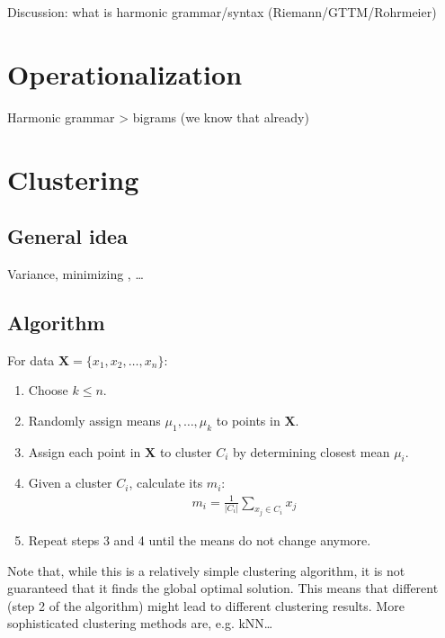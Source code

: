 \documentclass[letterpaper,10pt,english]{sphinxmanual}
\begin{document}
Discussion: what is harmonic grammar/syntax (Riemann/GTTM/Rohrmeier)


\section{Operationalization}
\label{\detokenize{billboard:operationalization}}
Harmonic grammar \textendash{}\textgreater{} bigrams (we know that already)


\section{Clustering}
\label{\detokenize{billboard:clustering}}

\subsection{General idea}
\label{\detokenize{billboard:general-idea}}
Variance, minimizing , …


\subsection{Algorithm}
\label{\detokenize{billboard:algorithm}}
For data \(\mathbf{X}=\{x_1, x_2, \ldots, x_n\}\):
\begin{enumerate}
%
\item {} 
Choose \(k \leq n\).

\item {} 
Randomly assign means \(\mu_1, \ldots, \mu_k\) to points in \(\mathbf{X}\).

\item {} 
Assign each point in \(\mathbf{X}\) to cluster \(C_i\) by determining closest mean \(\mu_i\).

\item {} 
Given a cluster \(C_i\), calculate its  \(m_i\):
\begin{align*}
   m_i =\frac{1}{|C_i|}\sum_{x_j \in C_i} x_j
\end{align*}
\item {} 
Repeat steps 3 and 4 until the means do not change anymore.

\end{enumerate}

Note that, while this is a relatively simple clustering algorithm, it is not guaranteed that it
finds the global optimal solution. This means that different  (step 2 of the algorithm)
might lead to different clustering results. More sophisticated clustering methods are, e.g. kNN…
\end{document}

